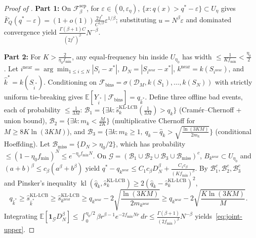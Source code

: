 \documentclass[10pt]{article}
\theoremstyle{plain}
\theoremstyle{definition}
\theoremstyle{remark}
\newcommand{\E}{\mathbb{E}}
\newcommand{\KL}{\operatorname{kl}}
\newcommand{\ind}{\mathbf{1}}
\begin{document}
\begin{proof}[Proof of ]
\textbf{Part 1:} On $\mathcal{F}_\beta^{\mathrm{sep}}$, for $\varepsilon \in (0, \varepsilon_\eta)$, $\{x : q(x) > q^* - \varepsilon\} \subset U_\eta$ gives $\bar{F}_Q(q^* - \varepsilon) = (1+o(1))\frac{2f^*}{C^{1/\beta}}\varepsilon^{1/\beta}$; substituting $u = N^\beta\varepsilon$ and dominated convergence yield $\frac{\Gamma(\beta+1)C}{(2f^*)^\beta}N^{-\beta}$.

\textbf{Part 2:} For $K > \frac{2}{\eta_0 f_{\min}}$, any equal-frequency bin inside $U_{\eta_0}$ has width $\le \frac{1}{K f_{\min}} < \frac{\eta_0}{2}$. Let $i^{\mathrm{near}} = \arg\min_{1\le i\le N}|S_i - x^*|$, $D_N = |S_{i^{\mathrm{near}}} - x^*|$, $k^{\mathrm{near}} = k(S_{i^{\mathrm{near}}})$, and $\hat{k}^* = k(S_{\hat{i}^*})$. Conditioning on $\mathcal{F}_{\mathrm{bins}} = \sigma(\mathcal{D}_M, k(S_1),\dots,k(S_N))$ with strictly uniform tie-breaking gives $\E[Y_{\hat{i}^*} \mid \mathcal{F}_{\mathrm{bins}}] = q_{\hat{k}^*}$. Define three offline bad events, each of probability $\le \frac{1}{3M}$: $\mathcal{B}_1 = \{\exists k: \hat{s}_k^{\mathrm{KL\text{-}LCB}}(\frac{1}{3M}) > q_k\}$ (Cram\'er--Chernoff + union bound), $\mathcal{B}_2 = \{\exists k: m_k < \frac{M}{2K}\}$ (multiplicative Chernoff for $M \ge 8K\ln(3KM)$), and $\mathcal{B}_3 = \{\exists k: m_k \ge 1,\ q_k - \hat{q}_k > \sqrt{\frac{\ln(3KM)}{2m_k}}\}$ (conditional Hoeffding). Let $\mathcal{B}_{\mathrm{miss}} = \{D_N > \eta_0/2\}$, which has probability $\le (1 - \eta_0 f_{\min})^N \le e^{-\eta_0 f_{\min}N}$. On $\mathcal{G} = (\mathcal{B}_1 \cup \mathcal{B}_2 \cup \mathcal{B}_3 \cup \mathcal{B}_{\mathrm{miss}})^c$, $B_{k^{\mathrm{near}}} \subset U_{\eta_0}$ and $(a+b)^\beta \le c_\beta(a^\beta + b^\beta)$ yield $q^* - q_{k^{\mathrm{near}}} \le C_1 c_\beta D_N^\beta + \frac{C_1 c_\beta}{(K f_{\min})^\beta}$. By $\mathcal{B}_1^c, \mathcal{B}_2^c, \mathcal{B}_3^c$ and Pinsker's inequality $\KL(\hat{q}_k, \hat{s}_k^{\mathrm{KL\text{-}LCB}}) \ge 2(\hat{q}_k - \hat{s}_k^{\mathrm{KL\text{-}LCB}})^2$,
\[
q_{\hat{k}^*} \ge \hat{s}_{\hat{k}^*}^{\mathrm{KL\text{-}LCB}} \ge \hat{s}_{k^{\mathrm{near}}}^{\mathrm{KL\text{-}LCB}} \ge q_{k^{\mathrm{near}}} - 2\sqrt{\frac{\ln(3KM)}{2m_{k^{\mathrm{near}}}}} \ge q_{k^{\mathrm{near}}} - 2\sqrt{\frac{K\ln(3KM)}{M}}.
\]
Integrating $\E[\ind_{\mathcal{G}}D_N^\beta] \le \int_0^{\eta_0/2}\beta r^{\beta-1}e^{-2f_{\min}Nr}\,dr \le \frac{\Gamma(\beta+1)}{(2f_{\min})^\beta}N^{-\beta}$ yields~\eqref{eq:joint-upper}.


\end{proof}
\end{document}
